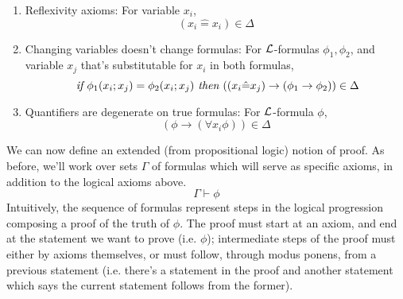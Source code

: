 \documentclass{article}
\begin{document}
{\begin{enumerate}
        $$ (\phi \rightarrow (\forall x_i \phi)) \in \Delta $$
    \item Reflexivity axioms: For variable $ x_i $,
        $$ (x_i \hat{=} x_i) \in \Delta $$
    \item Changing variables doesn't change formulas: For $ \mathcal{L} $-formulas $ \phi_1, \phi_2 $, and variable $ x_j $ that's substitutable for $ x_i $ in both formulas,
        $$ \textit{ if } \phi_1(x_i; x_j) = \phi_2(x_i; x_j) \textit{ then } ((x_i \hat{=} x_j) \rightarrow (\phi_1 \rightarrow \phi_2)) \in \Delta $$
    \item Quantifiers are degenerate on true formulas: For $ \mathcal{L} $-formula $ \phi $,
        $$ (\phi \rightarrow (\forall x_i \phi)) \in \Delta $$
\end{enumerate}}
We can now define an extended (from propositional logic) notion of proof. As before, we'll work over sets $ \Gamma $ of formulas which will serve as specific axioms, in addition to the logical axioms above.
    $$ \Gamma \vdash \phi $$
Intuitively, the sequence of formulas represent steps in the logical progression composing a proof of the truth of $ \phi $. The proof must start at an axiom, and end at the statement we want to prove (i.e. $ \phi $); intermediate steps of the proof must either by axioms themselves, or must follow, through modus ponens, from a previous statement (i.e. there's a statement in the proof and another statement which says the current statement follows from the former).
\end{document}
